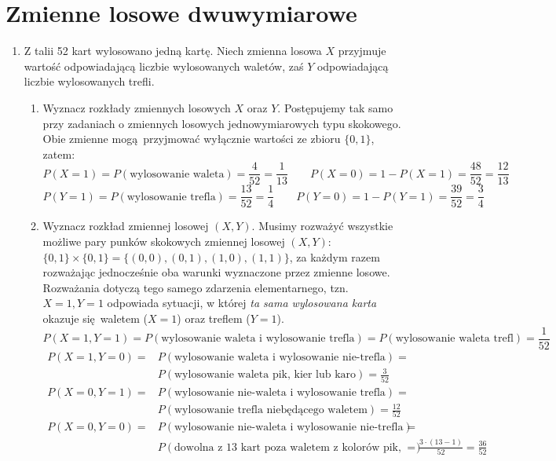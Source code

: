 \documentclass[twoside]{mwart}
\newenvironment{ansenv}{\comment}{\endcomment}
\newenvironment{ansenv}{\paragraph{Odpowiedź:}}{}
\begin{document}
\section{Zmienne losowe dwuwymiarowe}
\begin{enumerate}
\item Z talii 52 kart wylosowano jedną kartę. Niech zmienna losowa $X$ przyjmuje wartość odpowiadającą liczbie wylosowanych waletów, zaś $Y$ odpowiadającą liczbie wylosowanych trefli.
\begin{enumerate}
\item Wyznacz rozkłady zmiennych losowych $X$ oraz $Y$. 
\begin{ansenv}
	Postępujemy tak samo przy zadaniach o zmiennych losowych jednowymiarowych typu skokowego. Obie zmienne mogą przyjmować wyłącznie wartości ze zbioru $\{0, 1\}$, zatem:
	\[ P(X=1) = P(\text{wylosowanie waleta}) = \frac{4}{52}=\frac{1}{13} \qquad P(X=0)=1-P(X=1)=\frac{48}{52}=\frac{12}{13} \]
	\[ P(Y=1) = P(\text{wylosowanie trefla}) = \frac{13}{52}=\frac{1}{4} \qquad P(Y=0)=1-P(Y=1)=\frac{39}{52}=\frac{3}{4} \]
\end{ansenv}
\item Wyznacz rozkład zmiennej losowej $(X,Y)$. 
\begin{ansenv}
	Musimy rozważyć wszystkie możliwe pary punków skokowych zmiennej losowej $(X,Y)$: $\{0,1\}\times\{0,1\} = \{(0,0), (0, 1), (1, 0), (1,1)\}$, za każdym razem rozważając jednocześnie oba warunki wyznaczone przez zmienne losowe.
	Rozważania dotyczą tego samego zdarzenia elementarnego, tzn. $X=1, Y=1$ odpowiada sytuacji, w której \emph{ta sama wylosowana karta} okazuje się waletem ($X=1$) oraz treflem ($Y=1$).
	\[ P(X=1, Y=1) = P(\text{wylosowanie waleta i wylosowanie trefla}) = P(\text{wylosowanie waleta trefl}) = \frac{1}{52} \]
	\begin{align*}
	P(X=1, Y=0) = & P(\text{wylosowanie waleta i wylosowanie nie-trefla}) = \\ & P(\text{wylosowanie waleta pik, kier lub karo}) = \frac{3}{52}
	\end{align*}
	\begin{align*}
	P(X=0, Y=1) = & P(\text{wylosowanie nie-waleta i wylosowanie trefla}) = \\ & P(\text{wylosowanie trefla niebędącego waletem}) = \frac{12}{52} 
	\end{align*}
	\begin{align*}
	 P(X=0, Y=0) = & P(\text{wylosowanie nie-waleta i wylosowanie nie-trefla}) = \\  & P(\text{dowolna z 13 kart poza waletem z kolorów pik, kier, karo}) = \frac{3\cdot (13-1)}{52}=\frac{36}{52}

\end{align*}
\end{ansenv}
\end{enumerate}
\end{enumerate}
\end{document}
